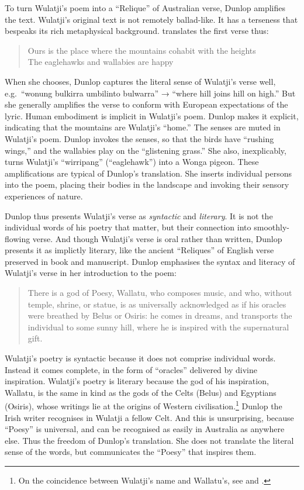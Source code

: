 \documentclass[
  Crown,
  times,
  sageh]{sagej}
\begin{document}
To turn Wulatji's poem into a ``Relique'' of Australian verse, Dunlop
amplifies the text. Wulatji's original text is not remotely ballad-like.
It has a terseness that bespeaks its rich metaphysical background.
\citet[206]{wafer_ghost-writing_2017} translates the first verse thus:

\begin{quote}
Ours is the place where the mountains cohabit with the heights\\
The eaglehawks and wallabies are happy
\end{quote}

When she chooses, Dunlop captures the literal sense of Wulatji's verse
well, e.g.~``wonung bulkirra umbilinto bulwarra'' → ``where hill joins
hill on high.'' But she generally amplifies the verse to conform with
European expectations of the lyric. Human embodiment is implicit in
Wulatji's poem. Dunlop makes it explicit, indicating that the mountains
are Wulatji's ``home.'' The senses are muted in Wulatji's poem. Dunlop
invokes the senses, so that the birds have ``rushing wings,'' and the
wallabies play on the ``glistening grass.'' She also, inexplicably,
turns Wulatji's ``wirripang'' (``eaglehawk'') into a Wonga pigeon. These
amplifications are typical of Dunlop's translation. She inserts
individual persons into the poem, placing their bodies in the landscape
and invoking their sensory experiences of nature.

Dunlop thus presents Wulatji's verse as \emph{syntactic} and
\emph{literary}. It is not the individual words of his poetry that
matter, but their connection into smoothly-flowing verse. And though
Wulatji's verse is oral rather than written, Dunlop presents it as
implictly literary, like the ancient ``Reliques'' of English verse
preserved in book and manuscript. Dunlop emphasises the syntax and
literacy of Wulatji's verse in her introduction to the poem:

\begin{quote}
There is a god of Poesy, Wallatu, who composes music, and who, without
temple, shrine, or statue, is as universally acknowledged as if his
oracles were breathed by Belus or Osiris: he comes in dreams, and
transports the individual to some sunny hill, where he is inspired with
the supernatural gift. \citep{wulatji_native_1848}
\end{quote}

Wulatji's poetry is syntactic because it does not comprise individual
words. Instead it comes complete, in the form of ``oracles'' delivered
by divine inspiration. Wulatji's poetry is literary because the god of
his inspiration, Wallatu, is the same in kind as the gods of the Celts
(Belus) and Egyptians (Osiris), whose writings lie at the origins of
Western civilisation.\footnote{On the coincidence between Wulatji's name
  and Wallatu's, see \citet[91]{oleary_giving_2004} and
  \citet[199]{wafer_ghost-writing_2017}.} Dunlop the Irish writer
recognises in Wulatji a fellow Celt. And this is unsurprising, because
``Poesy'' is universal, and can be recognised as easily in Australia as
anywhere else. Thus the freedom of Dunlop's translation. She does not
translate the literal sense of the words, but communicates the ``Poesy''
that inspires them.
\end{document}
